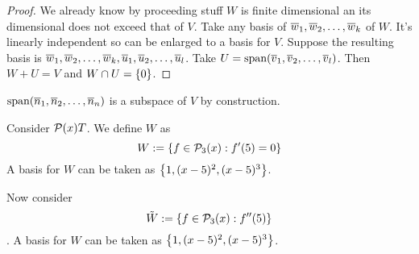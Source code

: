 \begin{proof}
    We already know by proceeding stuff $W$ is finite dimensional an its dimensional does not exceed that of $V$. Take any basis of ${\overline w}_1,{\overline w}_2, \ldots, {\overline w}_{k}$ of $W$. It's linearly independent so can be enlarged to a basis for $V$. Suppose the resulting basis is ${\overline w}_1,{\overline w}_2, \ldots, {\overline w}_{k}, {\overline u}_1,{\overline u}_2, \ldots, {\overline u}_{l}$. Take $U = \text{span} ({\overline v}_1,{\overline v}_2, \ldots, {\overline v}_{l})$. Then $W + U = V$ and $W \cap U = \left\{ 0 \right\}$. 
\end{proof}
\begin{remark}
    $\text{span} ({\overline n}_1,{\overline n}_2, \ldots, {\overline n}_{n})$ is a subspace of $V$ by construction.
\end{remark}
\begin{example}
    Consider $\mathcal P(x)T$. We define $W$ as
    \[ W:= \left\{ f \in \mathcal P_3(x) : f'(5) = 0 \right\}\]
    A basis for $W$ can be taken as $\left\{ 1, (x - 5)^2, (x-5)^3 \right\}$. 
    
    \noindent Now consider \[\tilde W:= \left\{ f \in \mathcal P_3(x) : f''(5) \right\}\].
    A basis for $W$ can be taken as $\left\{ 1, (x - 5)^2, (x-5)^3 \right\}$. \\
\end{example}
